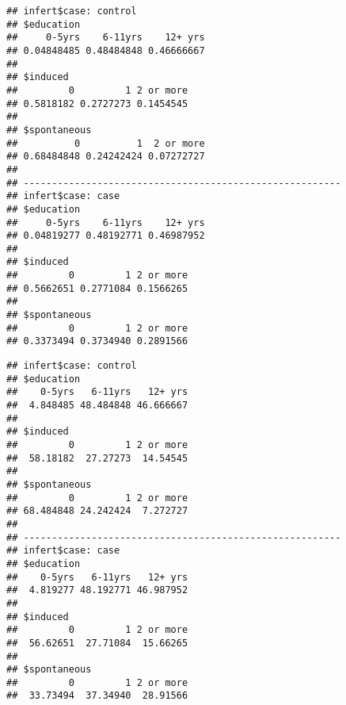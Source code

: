\documentclass[]{book}
\newenvironment{Shaded}{\begin{snugshade}}{\end{snugshade}}
\newcommand{\KeywordTok}[1]{\textcolor[rgb]{0.13,0.29,0.53}{\textbf{{#1}}}}
\newcommand{\DecValTok}[1]{\textcolor[rgb]{0.00,0.00,0.81}{{#1}}}
\newcommand{\StringTok}[1]{\textcolor[rgb]{0.31,0.60,0.02}{{#1}}}
\newcommand{\NormalTok}[1]{{#1}}
\theoremstyle{definition}
\theoremstyle{definition}
\theoremstyle{remark}
\begin{document}
\begin{Shaded}
\end{Shaded}

\begin{verbatim}
## infert$case: control
## $education
##     0-5yrs    6-11yrs    12+ yrs 
## 0.04848485 0.48484848 0.46666667 
## 
## $induced
##         0         1 2 or more 
## 0.5818182 0.2727273 0.1454545 
## 
## $spontaneous
##          0          1  2 or more 
## 0.68484848 0.24242424 0.07272727 
## 
## -------------------------------------------------------- 
## infert$case: case
## $education
##     0-5yrs    6-11yrs    12+ yrs 
## 0.04819277 0.48192771 0.46987952 
## 
## $induced
##         0         1 2 or more 
## 0.5662651 0.2771084 0.1566265 
## 
## $spontaneous
##         0         1 2 or more 
## 0.3373494 0.3734940 0.2891566
\end{verbatim}

\begin{Shaded}
\end{Shaded}

\begin{verbatim}
## infert$case: control
## $education
##    0-5yrs   6-11yrs   12+ yrs 
##  4.848485 48.484848 46.666667 
## 
## $induced
##         0         1 2 or more 
##  58.18182  27.27273  14.54545 
## 
## $spontaneous
##         0         1 2 or more 
## 68.484848 24.242424  7.272727 
## 
## -------------------------------------------------------- 
## infert$case: case
## $education
##    0-5yrs   6-11yrs   12+ yrs 
##  4.819277 48.192771 46.987952 
## 
## $induced
##         0         1 2 or more 
##  56.62651  27.71084  15.66265 
## 
## $spontaneous
##         0         1 2 or more 
##  33.73494  37.34940  28.91566
\end{verbatim}
\end{document}
